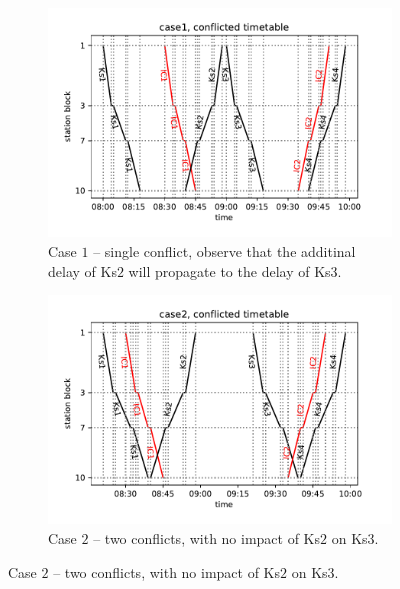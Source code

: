 \begin{figure}
  \begin{subfigure}[b]{0.4\columnwidth}
    \includegraphics[width=0.8\linewidth]{figures/case1_conflict}
    \caption{
      Case $1$ -- single conflict, observe that the additinal delay of Ks$2$ will propagate to the delay of Ks$3$.
    }
    \label{fig::c1_conflict}
  \end{subfigure}
  \begin{subfigure}[b]{0.4\columnwidth}
    \includegraphics[width=0.8\linewidth]{figures/case2_conflict}
    \caption{Case $2$ -- two conflicts, with no impact of Ks$2$ on Ks$3$.}
    \label{fig::c2_conflict}
  \end{subfigure}


\end{figure}
